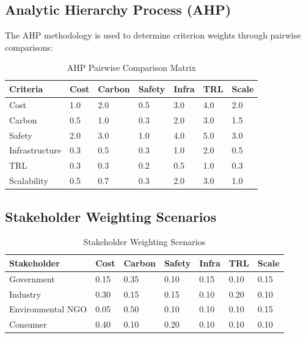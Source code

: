 \documentclass[12pt,twoside,openany]{book}
\newcommand{\tighttabular}{\small\setlength{\tabcolsep}{3.5pt}}
\begin{document}
\subsection{Analytic Hierarchy Process (AHP)}

The AHP methodology is used to determine criterion weights through pairwise comparisons:

\begin{table}[htbp]
    \centering
    \tighttabular
    \caption{AHP Pairwise Comparison Matrix}
    \label{tab:ahp}
    \begin{tabular}{C{3cm} C{1.5cm} C{1.5cm} C{1.5cm} C{1.5cm} C{1.5cm} C{1.5cm}}
    \hline
    \textbf{Criteria} & \textbf{Cost} & \textbf{Carbon} & \textbf{Safety}
                      & \textbf{Infra} & \textbf{TRL} & \textbf{Scale} \\
    \hline
    Cost             & 1.0 & 2.0 & 0.5 & 3.0 & 4.0 & 2.0 \\
    Carbon           & 0.5 & 1.0 & 0.3 & 2.0 & 3.0 & 1.5 \\
    Safety           & 2.0 & 3.0 & 1.0 & 4.0 & 5.0 & 3.0 \\
    Infrastructure   & 0.3 & 0.5 & 0.3 & 1.0 & 2.0 & 0.5 \\
    TRL              & 0.3 & 0.3 & 0.2 & 0.5 & 1.0 & 0.3 \\
    Scalability      & 0.5 & 0.7 & 0.3 & 2.0 & 3.0 & 1.0 \\
    \hline
    \end{tabular}
\end{table}

\subsection{Stakeholder Weighting Scenarios}

\begin{table}[htbp]
    \centering
    \tighttabular
    \caption{Stakeholder Weighting Scenarios}
    \label{tab:stakeholder}
    \begin{tabular}{L{3cm} C{1.5cm} C{1.5cm} C{1.5cm} C{1.5cm} C{1.5cm} C{1.5cm}}
    \hline
    \textbf{Stakeholder} & \textbf{Cost} & \textbf{Carbon} & \textbf{Safety}
                         & \textbf{Infra} & \textbf{TRL} & \textbf{Scale} \\
    \hline
    Government        & 0.15 & 0.35 & 0.10 & 0.15 & 0.10 & 0.15 \\
    Industry          & 0.30 & 0.15 & 0.15 & 0.10 & 0.20 & 0.10 \\
    Environmental NGO & 0.05 & 0.50 & 0.10 & 0.10 & 0.10 & 0.15 \\
    Consumer          & 0.40 & 0.10 & 0.20 & 0.10 & 0.10 & 0.10 \\
    \hline
    \end{tabular}
\end{table}
\end{document}
